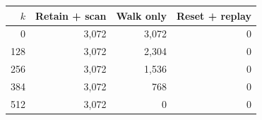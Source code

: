 \begin{tabular}{r r r r}
\toprule
$k$ & Retain + scan & Walk only & Reset + replay \\
\midrule
0 & 3,072 & 3,072 & 0 \\
128 & 3,072 & 2,304 & 0 \\
256 & 3,072 & 1,536 & 0 \\
384 & 3,072 & 768 & 0 \\
512 & 3,072 & 0 & 0 \\
\bottomrule
\end{tabular}
